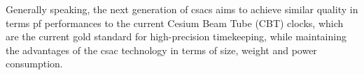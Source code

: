 Generally speaking, the next generation of \acrshort{csacs} aims to achieve similar quality in terms pf performances to the current Cesium Beam Tube (CBT) clocks, which are the current gold standard for high-precision timekeeping, while maintaining the advantages of the \acrshort{csac} technology in terms of size, weight and power consumption.

